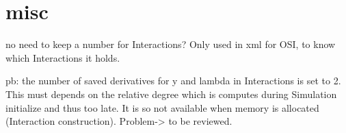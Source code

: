 \documentclass[10pt]{article}
\begin{document}
\ei

\section{misc}

\bei 
\item no need to keep a number for Interactions? Only used in xml for OSI, to know which Interactions it holds.
\item pb: the number of saved derivatives for y and lambda in Interactions is set to 2. This must depends on the relative degree which is computes during
Simulation initialize and thus too late. It is so not available when memory is allocated (Interaction construction). Problem-> to be reviewed.
\ei 
\end{document}
